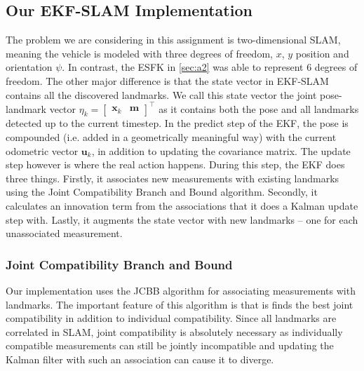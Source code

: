 \subsection{Our EKF-SLAM Implementation}
The problem we are considering in this assignment is two-dimensional SLAM, meaning the vehicle is modeled with three degrees of freedom, $x$, $y$ position and orientation $\psi$. In contrast, the ESFK in \ref{sec:a2} was able to represent 6 degrees of freedom. The other major difference is that the state vector in EKF-SLAM contains all the discovered landmarks. We call this state vector the joint pose-landmark vector $\eta_k = \begin{bmatrix} \mathbf{x}_k & \mathbf{m} \end{bmatrix}^{\top}$ as it contains both the pose and all landmarks detected up to the current timestep. In the predict step of the EKF, the pose is compounded (i.e. added in a geometrically meaningful way) with the current odometric vector $\mathbf{u}_k$, in addition to updating the covariance matrix. The update step however is where the real action happens. During this step, the EKF does three things. Firstly, it associates new measurements with existing landmarks using the Joint Compatibility Branch and Bound algorithm. Secondly, it calculates an innovation term from the associations that it does a Kalman update step with. Lastly, it augments the state vector with new landmarks – one for each unassociated measurement.

\subsubsection{Joint Compatibility Branch and Bound}
Our implementation uses the JCBB algorithm for associating measurements with landmarks. The important feature of this algorithm is that is finds the best joint compatibility in addition to individual compatibility. Since all landmarks are correlated in SLAM, joint compatibility is absolutely necessary as individually compatible measurements can still be jointly incompatible and updating the Kalman filter with such an association can cause it to diverge.\cite{jcbb}







